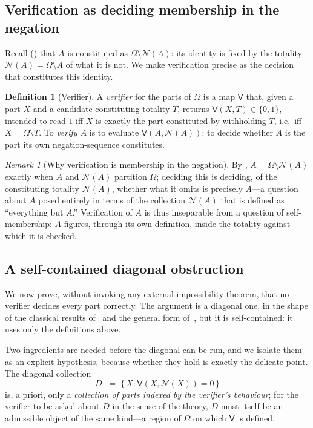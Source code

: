 \documentclass[11pt,a4paper]{article}
\theoremstyle{thmstyle}
\theoremstyle{definition}
\newtheorem{definition}[theorem]{Definition}
\theoremstyle{remark}
\newtheorem{remark}[theorem]{Remark}
\newcommand{\Space}{\Omega}
\newcommand{\Neg}{\mathcal{N}}
\newcommand{\Ver}{\mathsf{V}}
\begin{document}
\subsection{Verification as deciding membership in the negation}

Recall () that $A$ is constituted as $\Space\setminus\Neg(A)$:
its identity is fixed by the totality $\Neg(A)=\Space\setminus A$ of what it is
not. We make verification precise as the decision that constitutes this identity.

\begin{definition}[Verifier]
\label{def:verifier}
A \emph{verifier} for the parts of $\Space$ is a map $\Ver$ that, given a part
$X$ and a candidate constituting totality $T$, returns $\Ver(X,T)\in\{0,1\}$,
intended to read $1$ iff $X$ is exactly the part constituted by withholding $T$,
i.e.\ iff $X=\Space\setminus T$. To \emph{verify $A$} is to evaluate
$\Ver(A,\Neg(A))$: to decide whether $A$ is the part its own negation-sequence
constitutes.
\end{definition}

\begin{remark}[Why verification is membership in the negation]
\label{rem:ver-membership}
By , $A=\Space\setminus\Neg(A)$ exactly when $A$ and $\Neg(A)$
partition $\Space$; deciding this is deciding, of the constituting totality
$\Neg(A)$, whether what it omits is precisely $A$---a question about $A$ posed
entirely in terms of the collection $\Neg(A)$ that is defined as
``everything but $A$.'' Verification of $A$ is thus inseparable from a question
of self-membership: $A$ figures, through its own definition, inside the totality
against which it is checked.
\end{remark}

\subsection{A self-contained diagonal obstruction}

We now prove, without invoking any external impossibility theorem, that no
verifier decides every part correctly. The argument is a diagonal one, in the
shape of the classical results of~\citet{russell1903,cantor1891,tarski1936} and
the general form of~\citet{lawvere1969}, but it is self-contained: it uses only
the definitions above.

Two ingredients are needed before the diagonal can be run, and we isolate them as
an explicit hypothesis, because whether they hold is exactly the delicate point.
The diagonal collection
\[
D\;:=\;\bigl\{\,X : \Ver(X,\Neg(X))=0\,\bigr\}
\]
is, a priori, only a \emph{collection of parts indexed by the verifier's
behaviour}; for the verifier to be asked about $D$ in the sense of the theory, $D$
must itself be an admissible object of the same kind---a region of $\Space$ on
which $\Ver$ is defined.
\end{document}
